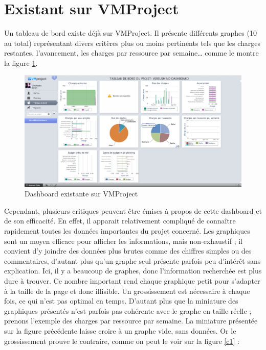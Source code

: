 \documentclass[12pt]{report}
\begin{document}
  
  \section{Existant sur VMProject}
  
  Un tableau de bord existe déjà sur VMProject. Il présente différents graphes (10 au total) représentant divers critères plus ou moins pertinents tels que les charges restantes, l’avancement, les charges par ressource par semaine… comme le montre la figure \ref{4}.\\
  
\begin{figure}[H]
	\centering
	\includegraphics[width=1\textwidth]{pictures/dashboardexistant.png}
	\caption{Dashboard existante sur VMProject}
	\label{4}
\end{figure}
  
  
  Cependant, plusieurs critiques peuvent être émises à propos de cette dashboard et de son efficacité. En effet, il apparait relativement compliqué de connaître rapidement toutes les données importantes du projet concerné. Les graphiques sont un moyen efficace pour afficher les informations, mais non-exhaustif ; il convient d’y joindre des données plus brutes comme des chiffres simples ou des commentaires, d’autant plus qu’un graphe seul présente parfois peu d’intérêt sans explication. Ici, il y a beaucoup de graphes, donc l’information recherchée est plus dure à trouver. Ce nombre important rend chaque graphique petit pour s’adapter à la taille de la page et donc illisible. Un grossissement est nécessaire à chaque fois, ce qui n’est pas optimal en temps. D’autant plus que la miniature des graphiques présentés n’est parfois pas cohérente avec le graphe en taille réelle ; prenons l’exemple des charges par ressource par semaine. La miniature présentée sur la figure précédente laisse croire à un graphe vide, sans données. Or le grossissement prouve le contraire, comme on peut le voir sur la figure \ref{c1} : 
\end{document}
